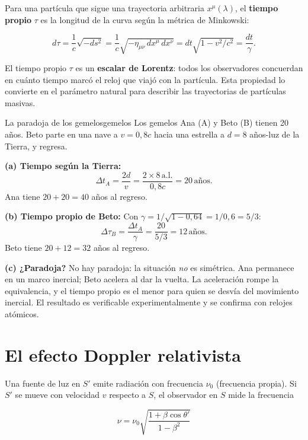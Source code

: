 Para una partícula que sigue una trayectoria arbitraria $x^\mu(\lambda)$, el \textbf{tiempo propio} $\tau$ es la longitud de la curva según la métrica de Minkowski:

\begin{equation}
  d\tau = \frac{1}{c}\sqrt{-ds^2} = \frac{1}{c}\sqrt{-\eta_{\mu\nu}\, dx^\mu\, dx^\nu}
        = dt\sqrt{1 - v^2/c^2} = \frac{dt}{\gamma}.
  \label{eq:tiempo_propio}
\end{equation}

El tiempo propio $\tau$ es un \textbf{escalar de Lorentz}: todos los observadores concuerdan en cuánto tiempo marcó el reloj que viajó con la partícula. Esta propiedad lo convierte en el parámetro natural para describir las trayectorias de partículas masivas.

\begin{ejemplo}{La paradoja de los gemelos}{gemelos}
Los gemelos Ana (A) y Beto (B) tienen 20 años. Beto parte en una nave a $v = 0{,}8c$ hacia una estrella a $d = 8$ años-luz de la Tierra, y regresa.

\textbf{(a) Tiempo según la Tierra:}
\[
  \Delta t_A = \frac{2d}{v} = \frac{2 \times 8\,\text{a.l.}}{0{,}8c} = 20\,\text{años}.
\]
Ana tiene $20 + 20 = 40$ años al regreso.

\textbf{(b) Tiempo propio de Beto:} Con $\gamma = 1/\sqrt{1-0{,}64} = 1/0{,}6 = 5/3$:
\[
  \Delta\tau_B = \frac{\Delta t_A}{\gamma} = \frac{20}{5/3} = 12\,\text{años}.
\]
Beto tiene $20 + 12 = 32$ años al regreso.

\textbf{(c) ¿Paradoja?} No hay paradoja: la situación \emph{no} es simétrica. Ana permanece en un marco inercial; Beto acelera al dar la vuelta. La aceleración rompe la equivalencia, y el tiempo propio es el menor para quien se desvía del movimiento inercial. El resultado es verificable experimentalmente y se confirma con relojes atómicos.
\end{ejemplo}

\section{El efecto Doppler relativista}

Una fuente de luz en $S'$ emite radiación con frecuencia $\nu_0$ (frecuencia propia). Si $S'$ se mueve con velocidad $v$ respecto a $S$, el observador en $S$ mide la frecuencia

\begin{equation}
  \nu = \nu_0 \sqrt{\frac{1 + \beta\cos\theta'}{1 - \beta^2}}
  \label{eq:doppler_general}
\end{equation}

